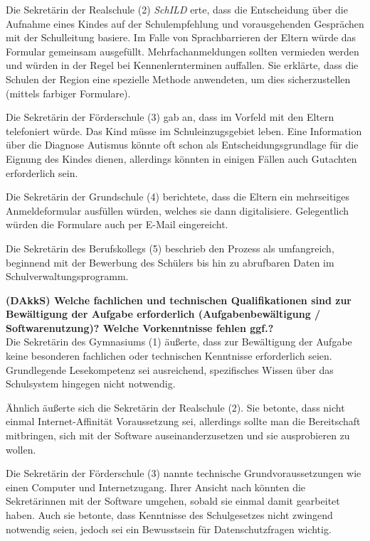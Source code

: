 Die Sekretärin der Realschule (2)  \textit{SchILD} erte, dass die Entscheidung über die Aufnahme eines Kindes auf der Schulempfehlung und vorausgehenden Gesprächen mit der Schulleitung basiere. Im Falle von Sprachbarrieren der Eltern würde das Formular gemeinsam ausgefüllt. Mehrfachanmeldungen sollten vermieden werden und würden in der Regel bei Kennenlernterminen auffallen. Sie erklärte, dass die Schulen der Region eine spezielle Methode anwendeten, um dies sicherzustellen (mittels farbiger Formulare).

Die Sekretärin der Förderschule (3) gab an, dass im Vorfeld mit den Eltern telefoniert würde. Das Kind müsse im Schuleinzugsgebiet leben. Eine Information über die Diagnose Autismus könnte oft schon als Entscheidungsgrundlage für die Eignung des Kindes dienen, allerdings könnten in einigen Fällen auch Gutachten erforderlich sein.

Die Sekretärin der Grundschule (4) berichtete, dass die Eltern ein mehrseitiges Anmeldeformular ausfüllen würden, welches sie dann digitalisiere. Gelegentlich würden die Formulare auch per E-Mail eingereicht.

Die Sekretärin des Berufskollegs (5) beschrieb den Prozess als umfangreich, beginnend mit der Bewerbung des Schülers bis hin zu abrufbaren Daten im Schulverwaltungsprogramm.

\textbf{(DAkkS) Welche fachlichen und technischen Qualifikationen sind zur Bewältigung der Aufgabe erforderlich (Aufgabenbewältigung / Softwarenutzung)? Welche Vorkenntnisse fehlen ggf.?}\\
Die Sekretärin des Gymnasiums (1) äußerte, dass zur Bewältigung der Aufgabe keine besonderen fachlichen oder technischen Kenntnisse erforderlich seien. Grundlegende Lesekompetenz sei ausreichend, spezifisches Wissen über das Schulsystem hingegen nicht notwendig.

Ähnlich äußerte sich die Sekretärin der Realschule (2). Sie betonte, dass nicht einmal Internet-Affinität Voraussetzung sei, allerdings sollte man die Bereitschaft mitbringen, sich mit der Software auseinanderzusetzen und sie ausprobieren zu wollen.

Die Sekretärin der Förderschule (3) nannte technische Grundvoraussetzungen wie einen Computer und Internetzugang. Ihrer Ansicht nach könnten die Sekretärinnen mit der Software umgehen, sobald sie einmal damit gearbeitet haben. Auch sie betonte, dass Kenntnisse des Schulgesetzes nicht zwingend notwendig seien, jedoch sei ein Bewusstsein für Datenschutzfragen wichtig.

